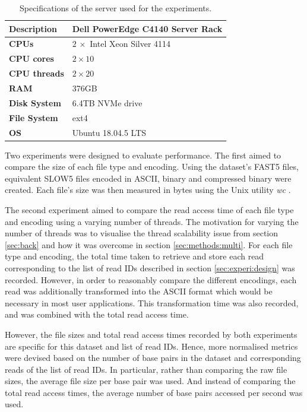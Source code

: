 \begin{table}[h!]
    \caption{Specifications of the server used for the experiments.\label{tab:server}}
    \begin{tabular}{|l|l|}
        \hline
        \textbf{Description} & Dell PowerEdge C4140 Server Rack \\
        \hline
        \textbf{CPUs} & $2\, \times$ Intel Xeon Silver 4114 \\
        \textbf{CPU cores} & $2 \times 10$ \\
        \textbf{CPU threads} & $2 \times 20$ \\
        \hline
        \textbf{RAM\nomenclature{RAM}{Random-access memory}} & 376GB \\
        \textbf{Disk System} & 6.4TB NVMe drive \\
        \textbf{File System} & ext4 \\
        \textbf{OS\nomenclature{OS}{Operating system}} & Ubuntu 18.04.5 LTS\\
        \hline
    \end{tabular}
\end{table}

Two experiments were designed to evaluate performance. The first aimed to compare the size of each file type and encoding. Using the dataset's FAST5 files, equivalent SLOW5 files encoded in ASCII, binary and compressed binary were created. Each file's size was then measured in bytes using the Unix utility \textit{wc} \cite{wc}.

The second experiment aimed to compare the read access time of each file type and encoding using a varying number of threads. The motivation for varying the number of threads was to visualise the thread scalability issue from section \ref{sec:back} and how it was overcome in section \ref{sec:methods:multi}. For each file type and encoding, the total time taken to retrieve and store each read corresponding to the list of read IDs described in section \ref{sec:experi:design} was recorded. However, in order to reasonably compare the different encodings, each read was additionally transformed into the ASCII format which would be necessary in most user applications. This transformation time was also recorded, and was combined with the total read access time.

However, the file sizes and total read access times recorded by both experiments are specific for this dataset and list of read IDs. Hence, more normalised metrics were devised based on the number of base pairs in the dataset and corresponding reads of the list of read IDs. In particular, rather than comparing the raw file sizes, the average file size per base pair was used. And instead of comparing the total read access times, the average number of base pairs accessed per second was used.

